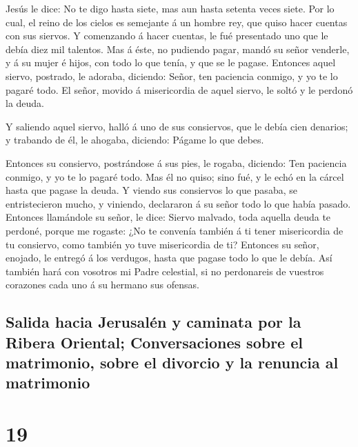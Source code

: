  Jesús le dice: No te digo hasta siete, mas aun hasta
setenta veces siete.  Por lo cual, el reino de los cielos
es semejante á un hombre rey, que quiso hacer cuentas con sus siervos.
 Y comenzando á hacer cuentas, le fué presentado uno que
le debía diez mil talentos.  Mas á éste, no pudiendo
pagar, mandó su señor venderle, y á su mujer é hijos, con todo lo que
tenía, y que se le pagase.  Entonces aquel siervo,
postrado, le adoraba, diciendo: Señor, ten paciencia conmigo, y yo te lo
pagaré todo.  El señor, movido á misericordia de aquel
siervo, le soltó y le perdonó la deuda.

 Y saliendo aquel siervo, halló á uno de sus consiervos,
que le debía cien denarios; y trabando de él, le ahogaba, diciendo:
Págame lo que debes.

 Entonces su consiervo, postrándose á sus pies, le
rogaba, diciendo: Ten paciencia conmigo, y yo te lo pagaré todo.
 Mas él no quiso; sino fué, y le echó en la cárcel hasta
que pagase la deuda.  Y viendo sus consiervos lo que
pasaba, se entristecieron mucho, y viniendo, declararon á su señor todo
lo que había pasado.  Entonces llamándole su señor, le
dice: Siervo malvado, toda aquella deuda te perdoné, porque me rogaste:
 ¿No te convenía también á ti tener misericordia de tu
consiervo, como también yo tuve misericordia de ti? 
Entonces su señor, enojado, le entregó á los verdugos, hasta que pagase
todo lo que le debía.  Así también hará con vosotros mi
Padre celestial, si no perdonareis de vuestros corazones cada uno á su
hermano sus ofensas.

\hypertarget{salida-hacia-jerusaluxe9n-y-caminata-por-la-ribera-oriental-conversaciones-sobre-el-matrimonio-sobre-el-divorcio-y-la-renuncia-al-matrimonio}{%
\subsection{Salida hacia Jerusalén y caminata por la Ribera Oriental;
Conversaciones sobre el matrimonio, sobre el divorcio y la renuncia al
matrimonio}\label{salida-hacia-jerusaluxe9n-y-caminata-por-la-ribera-oriental-conversaciones-sobre-el-matrimonio-sobre-el-divorcio-y-la-renuncia-al-matrimonio}}

\hypertarget{section-40-19}{%
\section{19}\label{section-40-19}}

